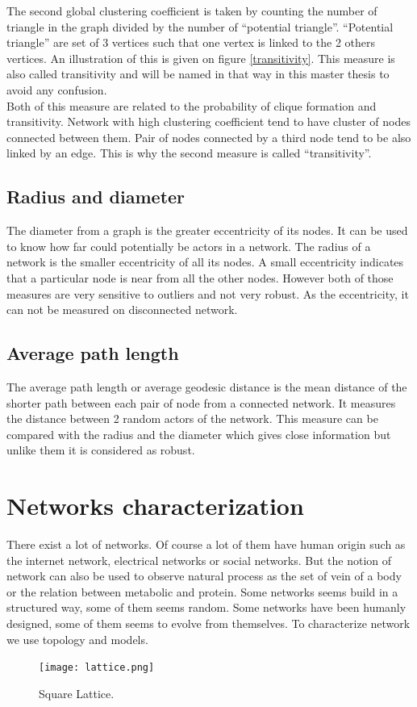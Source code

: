 \documentclass[a4paper, 12pt]{report}
\begin{document}
The second global clustering coefficient is taken by counting the number of triangle in the graph divided by the number of ``potential triangle''. ``Potential triangle'' are set of 3 vertices such that one vertex is linked to the 2 others vertices. An illustration of this is given on figure \ref{transitivity}. This measure is also called  transitivity and will be named in that way in this master thesis to avoid any confusion. \\

Both of this measure are related to the probability of clique formation and transitivity. Network with high clustering coefficient tend to have cluster of nodes connected between them. Pair of nodes connected by a third node tend to be also linked by an edge. This is why the second measure is called ``transitivity''.\\

\subsection{Radius and diameter}
The diameter from a graph is the greater eccentricity of its nodes. It can be used to know how far could potentially be actors in a network. The radius of a network is the smaller eccentricity of all its nodes. A small eccentricity indicates that a particular node is  near from all the other nodes. However both of those measures are very sensitive to outliers and not very robust. As the eccentricity, it can not be measured on disconnected network.

\subsection{Average path length}
The average path length \citep{path_length} or average geodesic distance is the mean distance of the shorter path between each pair of node from a connected network. It measures the distance between 2 random actors of the network. This measure can be compared with the radius and the diameter which gives close information but unlike them it is considered as robust.
 
\section{Networks characterization}
There exist a lot of networks. Of course a lot of them have human origin such as the internet network, electrical networks or social networks. But the notion of network can also be used to observe natural process as the set of vein of a body or the relation between metabolic and protein. Some networks seems build in a structured way, some of them seems random. Some networks have been humanly designed, some of them seems to evolve from themselves. To characterize network we use topology and models.\\
\begin{figure}
\centering
\texttt{[image: lattice.png]}
\caption{Square Lattice. \citep{complex_networks} }
\label{lattice}
\end{figure}
\end{document}
